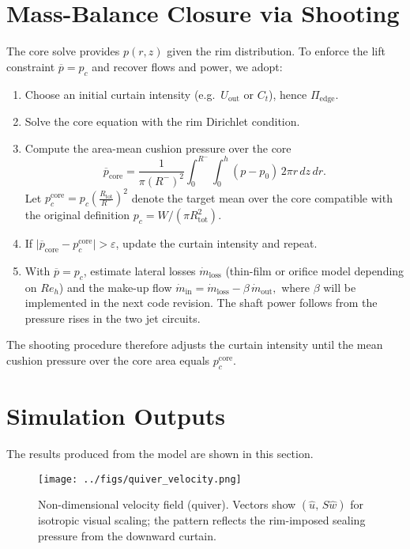 \documentclass[11pt,a4paper]{article}
\begin{document}
\section{Mass-Balance Closure via Shooting}
\label{sec:shooting}
The core solve provides $p(r,z)$ given the rim distribution. To enforce the lift
constraint $\overline{p}=p_c$ and recover flows and power, we adopt:
\begin{enumerate}
  \item Choose an initial curtain intensity (e.g.\ $U_{\mathrm{out}}$ or $C_t$), hence
        $\Pi_{\mathrm{edge}}$.
  \item Solve the core equation with the rim Dirichlet condition.
  \item Compute the area-mean cushion pressure over the core
  \[
    \overline{p}_{\mathrm{core}}=\frac{1}{\pi (R^-)^2}
    \int_0^{R^{-}}\!\!\int_0^h (p-p_0)\,2\pi r\,dz\,dr.
  \]
  Let $p_c^{\mathrm{core}} = p_c \left(\frac{R_{\mathrm{tot}}}{R^-}\right)^2$ denote the
  target mean over the core compatible with the original definition
  $p_c=W/(\pi R_{\mathrm{tot}}^2)$.
  \item If $\big|\overline{p}_{\mathrm{core}}-p_c^{\mathrm{core}}\big|>\varepsilon$, update
  the curtain intensity and repeat.

  \item With $\overline{p}=p_c$, estimate lateral losses $\dot m_{\mathrm{loss}}$ (thin-film
  or orifice model depending on $Re_h$) and the make-up flow
  \(
    \dot m_{\mathrm{in}}=\dot m_{\mathrm{loss}}-\beta\,\dot m_{\mathrm{out}},
  \)
  where $\beta$ will be implemented in the next code revision. The shaft power follows
  from the pressure rises in the two jet circuits.
\end{enumerate}
The shooting procedure therefore adjusts the curtain intensity until the mean cushion
pressure over the core area equals $p_c^{\mathrm{core}}$.


\section{Simulation Outputs}
The results produced from the model are shown in this section.
\begin{figure}[H]
  \centering
  \texttt{[image: ../figs/quiver\_velocity.png]}
  \caption{Non-dimensional velocity field (quiver).
Vectors show $(\hat u,\,S\hat w)$ for isotropic visual scaling; the pattern reflects the rim-imposed sealing pressure from the downward curtain.}
  \label{fig:quiver}
\end{figure}
\end{document}
